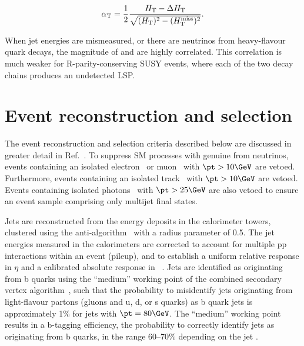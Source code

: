 \begin{equation}
  \label{eq:alphat}
  \alpha_\mathrm{T} = \frac{1}{2} \frac{H_\text{T} -
    \Delta H_\text{T}}{\sqrt{(H_\text{T})^2 - (H_\text{T}^\text{miss})^2}}.
\end{equation}

When jet energies are mismeasured, or there are neutrinos from
heavy-flavour quark decays, the magnitude of \HTmiss and \dht are
highly correlated. This correlation is much weaker for
R-parity-conserving SUSY events, where each of the two decay chains
produces an undetected LSP.

\section{Event reconstruction and selection}
\label{sec:selections}

The event reconstruction and selection criteria described below are
discussed in greater detail in Ref.~\cite{RA1Paper2012}. To suppress
SM processes with genuine \ptvecmiss from neutrinos, events containing
an isolated electron~\cite{Khachatryan:2015hwa} or
muon~\cite{Chatrchyan:2012xi} with $\pt > 10\GeV$ are
vetoed. Furthermore, events containing an isolated
track~\cite{single-lepton-stop} with $\pt > 10\GeV$ are vetoed. Events
containing isolated photons~\cite{Khachatryan:2015iwa} with $\pt >
25\GeV$ are also vetoed to ensure an event sample comprising only
multijet final states.

Jets are reconstructed from the energy deposits in the calorimeter
towers, clustered using the anti-\kt algorithm~\cite{antikt} with a
radius parameter of 0.5. The jet energies measured in the calorimeters
are corrected to account for multiple pp interactions within an event
(pileup), and to establish a uniform relative response in $\eta$ and a
calibrated absolute response in \pt~\cite{Chatrchyan:2011ds}.  Jets
are identified as originating from b quarks using the ``medium''
working point of the combined secondary vertex
algorithm~\cite{Chatrchyan:2012jua}, such that the probability to
misidentify jets originating from light-flavour partons (gluons and u,
d, or s quarks) as b quark jets is approximately 1\% for jets with
$\pt = 80\GeV$. The ``medium'' working point results in a b-tagging
efficiency, \ie the probability to correctly identify jets as
originating from b quarks, in the range 60--70\% depending on the jet
\pt.

